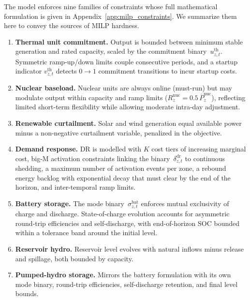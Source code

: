 \documentclass{article}
\begin{document}
The model enforces nine families of constraints whose full mathematical formulation is given in Appendix~\ref{app:milp_constraints}. We summarize them here to convey the sources of MILP hardness.

\begin{enumerate}[label=\textbf{(\roman*)}, noitemsep]
  \item \textbf{Thermal unit commitment.}
    Output is bounded between minimum stable generation and rated capacity, scaled by the commitment binary~$u^{\mathrm{th}}_{z,t}$. Symmetric ramp-up/down limits couple consecutive periods, and a startup indicator $v^{\mathrm{th}}_{z,t}$ detects $0{\to}1$ commitment transitions to incur startup costs.

  \item \textbf{Nuclear baseload.}
    Nuclear units are always online (must-run) but may modulate output within capacity and ramp limits ($R^{\mathrm{nuc}}_z = 0.5\,\overline{P}^{\mathrm{nuc}}_z$), reflecting limited short-term flexibility while allowing moderate intra-day adjustment.

  \item \textbf{Renewable curtailment.}
    Solar and wind generation equal available power minus a non-negative curtailment variable, penalized in the objective.

  \item \textbf{Demand response.}
    DR is modelled with $K$ cost tiers of increasing marginal cost, big-M activation constraints linking the binary~$\delta^{\mathrm{dr}}_{z,t}$ to continuous shedding, a maximum number of activation events per zone, a rebound energy backlog with exponential decay that must clear by the end of the horizon, and inter-temporal ramp limits.

  \item \textbf{Battery storage.}
    The mode binary~$\sigma^{\mathrm{bat}}_{z,t}$ enforces mutual exclusivity of charge and discharge. State-of-charge evolution accounts for asymmetric round-trip efficiencies and self-discharge, with end-of-horizon SOC bounded within a tolerance band around the initial level.

  \item \textbf{Reservoir hydro.}
    Reservoir level evolves with natural inflows minus release and spillage, both bounded by capacity.

  \item \textbf{Pumped-hydro storage.}
    Mirrors the battery formulation with its own mode binary, round-trip efficiencies, self-discharge retention, and final level bounds.


\end{enumerate}
\end{document}
